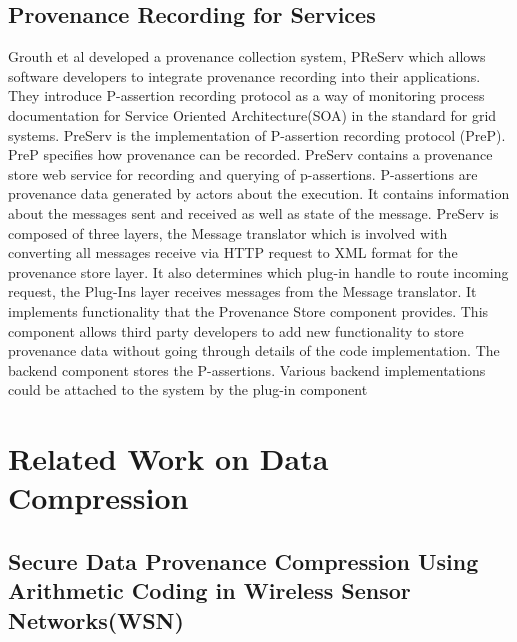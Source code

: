 \subsection{Provenance Recording for Services}
Grouth et al \cite{groth} developed a provenance collection system, PReServ which allows software developers to integrate provenance recording into their applications. They introduce P-assertion recording protocol as a way of monitoring process  documentation for Service Oriented Architecture(SOA) in the standard for grid systems. PreServ is the implementation of P-assertion recording protocol (PreP). PreP specifies how provenance can be recorded. PreServ contains a provenance store web service for recording and querying of p-assertions. P-assertions are provenance data generated by actors about the execution. It contains information about the messages sent and received as well as state of the message. PreServ is composed of three layers, the Message translator which is involved with converting all messages receive via HTTP request to XML format for the provenance store layer. It also determines which plug-in handle to route incoming request, the  Plug-Ins layer receives messages from the Message translator. It implements functionality that the Provenance Store component provides. This component allows third party developers to add new functionality to store provenance data without going through details of the code implementation. The backend component stores the P-assertions. Various backend implementations could be attached to the system by the plug-in component



\section{Related Work on Data Compression}

\subsection{Secure Data Provenance Compression Using Arithmetic Coding in Wireless Sensor Networks(WSN)}

